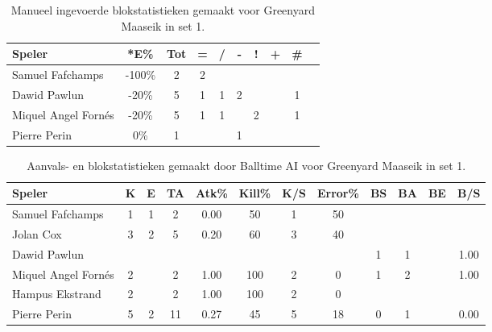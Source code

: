 \begin{table}[ht!]
    \centering
    \scriptsize
    \begin{tabular}{|l|c|c|c|c|c|c|c|c|c|} \hline
        \textbf{Speler} & *E\% & Tot & = & / & - & ! & + & \# \\ \hline
        Samuel Fafchamps & -100\% & 2 & 2 &  &  &  &  & \\ 
        Dawid Pawlun & -20\% & 5 & 1 & 1 & 2 & & & 1 \\ 
        Miquel Angel Fornés & -20\% & 5 & 1 & 1 &  & 2 & & 1 \\
        Pierre Perin & 0\% & 1 &  &  & 1 &  &  &\\ \hline
    \end{tabular}
    \caption[Manueel ingevoerde blokstatistieken gemaakt Greenyard Maaseik in set 1]{\label{tab:PL3BlockMaaseikMan1}Manueel ingevoerde blokstatistieken gemaakt voor Greenyard Maaseik in set 1.}
\end{table}

\begin{table}[ht!]
  \centering
  \scriptsize
    \begin{tabular}{|l|c|c|c|c|c|c|c|c|c|c|c|} \hline
    \textbf{Speler} & K & E & TA & Atk\% & Kill\% & K/S & Error\% & BS & BA & BE & B/S \\ \hline
    Samuel Fafchamps & 1 & 1 & 2 & 0.00 & 50 & 1 & 50 &  &  &  & \\
    Jolan Cox & 3 & 2 & 5 & 0.20 & 60 & 3 & 40 &   &  &  &  \\
    Dawid Pawlun &   &   &   &   &   &   &   & 1 & 1 & & 1.00\\
    Miquel Angel Fornés & 2 &  & 2 & 1.00 & 100 & 2 & 0 & 1 & 2 & & 1.00\\
    Hampus Ekstrand & 2 &  & 2 & 1.00 & 100 & 2 & 0 &  & & & \\
    Pierre Perin & 5 & 2 & 11 & 0.27 & 45 & 5 & 18 & 0 & 1 &  & 0.00\\ \hline
  \end{tabular}
  \caption[Aanvals- en blokstatistieken gemaakt door Balltime AI voor Greenyard Maaseik in set 1]{\label{tab:PL3AttBlockMaaseikAI1}Aanvals- en blokstatistieken gemaakt door Balltime AI voor Greenyard Maaseik in set 1.}
\end{table}
